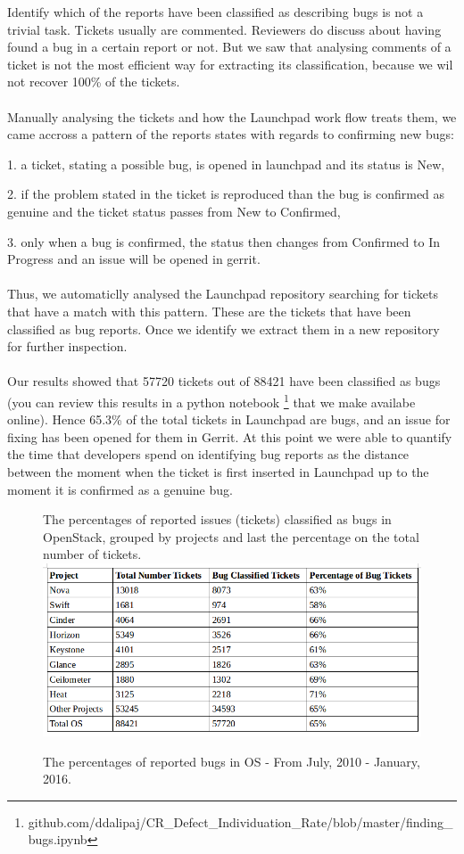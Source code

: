 \documentclass[ifip]{svmult}
\begin{document}
Identify which of the reports have been classified as describing bugs is not a trivial task.
Tickets usually are commented. Reviewers do discuss about having found a bug in a certain report or not. 
But we saw that analysing comments of a ticket is not the most efficient way for extracting its classification, 
because we wil not recover 100\% of the tickets.
\\
\\
Manually analysing the tickets and how the Launchpad work flow treats them, we came accross a pattern 
of the reports states with regards to confirming new bugs:

1. a ticket, stating a possible bug, is opened in launchpad and its status is New,

2. if the problem stated in the ticket is reproduced than the bug is confirmed as genuine and the 
ticket status passes from New to Confirmed,

3. only when a bug is confirmed, the status then changes from Confirmed to In Progress and 
an issue will be opened in gerrit.
\\
\\
Thus, we automaticlly analysed the Launchpad repository searching for tickets that have a match with this pattern. 
These are the tickets that have been classified as bug reports. Once we identify we extract them in a new repository for further 
inspection.   
\\
\\
Our results showed that \/ 57720 tickets out of 88421 have been classified as bugs 
(you can review this results in a python notebook 
\footnote{github.com/ddalipaj/CR\_Defect\_Individuation\_Rate/blob/master/finding\_bugs.ipynb} 
that we make availabe online). 
Hence 65.3\% of the total tickets in Launchpad are bugs, and an issue for fixing has been opened for them in Gerrit. 
At this point we were able to quantify the time that developers spend on identifying bug reports as the distance between 
the moment when the ticket is first inserted in Launchpad up to the moment it is confirmed as a genuine bug.

\begin{figure}[H]
\centering
 The percentages of reported issues (tickets) classified as bugs in OpenStack, grouped by projects and last the percentage 
 on the total number of tickets.
\includegraphics[width=1.0\textwidth,natwidth=786,natheight=360]{bugs_time.png}

\caption{The percentages of reported bugs in OS - From July, 2010 - January, 2016.}
\label{fig:1}       %
\end{figure}
\end{document}
